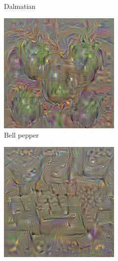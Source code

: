 \begin{figure}[t]
\begin{subfigure}[b]{0.3\textwidth}
    \caption{Dalmatian}
    \label{fig:sec:context:deep-visualization-class-2}
  \end{subfigure}
  \hfill
  \begin{subfigure}[b]{0.3\textwidth}
    \includegraphics[width=\textwidth]{gfx/deep-visualization-class-3}
    \caption{Bell pepper}
    \label{fig:sec:context:deep-visualization-class-3}
  \end{subfigure}
  \par\medskip
  \begin{subfigure}[b]{0.3\textwidth}
    \includegraphics[width=\textwidth]{gfx/deep-visualization-class-4}

\end{subfigure}
\end{figure}
